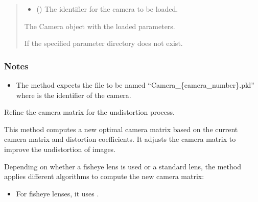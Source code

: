 \documentclass[letterpaper,10pt,english]{sphinxmanual}
\begin{document}
\begin{fulllineitems}
\begin{fulllineitems}
\begin{quote}
\begin{description}
\begin{itemize}
\item {} 
\sphinxAtStartPar
{} () \textendash{} The identifier for the camera to be loaded.

\end{itemize}

\sphinxAtStartPar
The Camera object with the loaded parameters.

\sphinxAtStartPar
{\hyperref[\detokenize{CameraUtils:CameraUtils.Camera}]{}}

\sphinxAtStartPar
{} \textendash{} If the specified parameter directory does not exist.

\end{description}\end{quote}
\subsubsection*{Notes}
\begin{itemize}
\item {} 
\sphinxAtStartPar
The method expects the file to be named “Camera\_\{camera\_number\}.pkl”
where  is the identifier of the camera.

\end{itemize}

\end{fulllineitems}


\begin{fulllineitems}
\label{\detokenize{CameraUtils:id15}}
\pysigstartsignatures
{}
\pysigstopsignatures
\sphinxAtStartPar
Refine the camera matrix for the undistortion process.

\sphinxAtStartPar
This method computes a new optimal camera matrix based on the current
camera matrix and distortion coefficients. It adjusts the camera matrix
to improve the undistortion of images.

\sphinxAtStartPar
Depending on whether a fisheye lens is used or a standard lens, the
method applies different algorithms to compute the new camera matrix:
\begin{itemize}
\item {} 
\sphinxAtStartPar
For fisheye lenses, it uses
.


\end{itemize}
\end{fulllineitems}
\end{fulllineitems}
\end{document}
